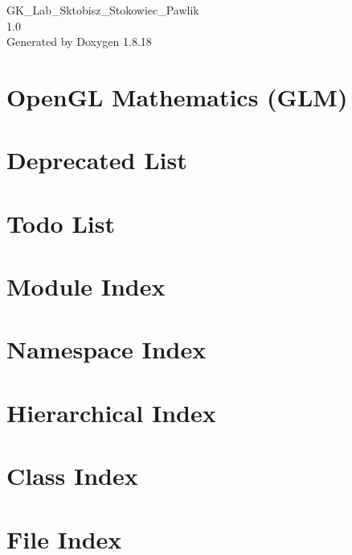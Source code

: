 \let\mypdfximage\pdfximage\def\pdfximage{\immediate\mypdfximage}\documentclass[twoside]{book}
\newcommand{\+}{\discretionary{\mbox{\scriptsize$\hookleftarrow$}}{}{}}
\newcommand{\clearemptydoublepage}{%
  \newpage{\pagestyle{empty}\cleardoublepage}%
}
\begin{document}
\hypersetup{pageanchor=false,
             bookmarksnumbered=true,
             pdfencoding=unicode
            }
\begin{titlepage}
\vspace*{7cm}
\begin{center}%
{\Large G\+K\+\_\+\+Lab\+\_\+\+Sktobisz\+\_\+\+Stokowiec\+\_\+\+Pawlik \\[1ex]\large 1.\+0 }\\
\vspace*{1cm}
{\large Generated by Doxygen 1.8.18}\\
\end{center}
\end{titlepage}
\clearemptydoublepage
{}
\tableofcontents
\clearemptydoublepage
{}
\hypersetup{pageanchor=true}

\chapter{Open\+GL Mathematics (G\+LM)}
\label{index}\hypertarget{index}{}
\chapter{Deprecated List}
\label{deprecated}

\chapter{Todo List}
\label{todo}

\chapter{Module Index}

\chapter{Namespace Index}

\chapter{Hierarchical Index}

\chapter{Class Index}

\chapter{File Index}

\end{document}
